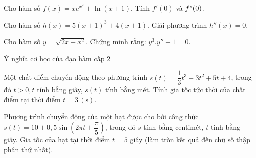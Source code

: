 \begin{vd}
	Cho hàm số $f(x)=x e^{x^2}+\ln (x+1)$. Tính $f'(0)$ và $f"(0)$.
\end{vd} 

\begin{vd}
	Cho hàm số $h(x)=5\left(x+1\right)^3+4\left(x+1\right)$. Giải phương trình $h''(x)=0$.
\end{vd} 

\begin{vd}%
	Cho hàm số $y=\sqrt{2x-x^2}$. Chứng minh rằng: $y^3.{y}''+1=0.$
\end{vd} 

\begin{dang}{Ý nghĩa cơ học của đạo hàm cấp 2}
\end{dang}

\begin{vd}%
	Một chất điểm chuyển động theo phương trình $s(t)=\dfrac{1}{3} t^3-3 t^2+5 t+4$, trong đó $t>0, t$ tính bằng giây, $s(t)$ tính bằng mét. Tính gia tốc tức thời của chất điểm tại thời điểm $t=3 \,(\mathrm{s})$.
\end{vd} 

\begin{vd}%
	Phương trình chuyển động của một hạt được cho bởi công thức $s(t)=10+0{,}5\sin \left(2\pi t+\dfrac{\pi}{5}\right)$, trong đó $s$ tính bằng centimét, $t$ tính bằng giây. Gia tốc của hạt tại thời điểm $t=5$ giây (làm tròn kết quả đến chữ số thập phân thứ nhất).
	
\end{vd} 



